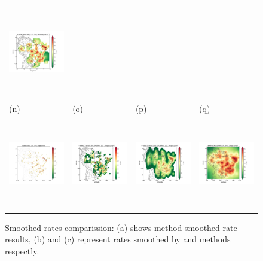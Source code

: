 \documentclass[draft, grl]{agutex}
\begin{document}
\begin{figure}
\begin{center}
\begin{table}[H]
\begin{tabular}{ p{}
						 p{}
						 p{}
						 p{} }
		\includegraphics[height=4cm]{z_img_woo_assump_50} 
		\\
		\footnotesize(n) &
		\footnotesize(o) &
		\footnotesize(p) &
		\footnotesize(q)
		\\
		\includegraphics[height=4cm]{z_img_2dhist_stepp_50}  &
		\includegraphics[height=4cm]{z_img_f_stepp_50_50} &
		\includegraphics[height=4cm]{z_img_f_stepp_150_50} &
		\includegraphics[height=4cm]{z_img_woo_stepp_50} 


		\end{tabular}
	\end{table}
	\caption{Smoothed rates comparission: (a) shows \citet{frankel_1995} method smoothed rate results, (b) and (c) represent rates smoothed by \citet{woo_1996} and \citet{helmstetter_2012} methods respectly.}
	\label{fig_rates2}
	\end{center}
\end{figure}
\end{document}
